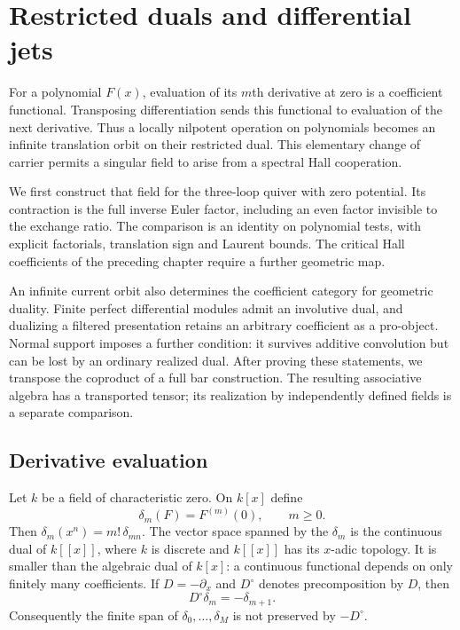 \chapter{Restricted duals and differential jets}
\label{cyjets:ch}
\begingroup
\def\eps{\epsilon}

For a polynomial $F(x)$, evaluation of its $m$th derivative at zero
is a coefficient functional. Transposing differentiation sends this
functional to evaluation of the next derivative. Thus a locally nilpotent
operation on polynomials becomes an infinite translation orbit on their
restricted dual. This elementary change of carrier permits a singular
field to arise from a spectral Hall cooperation.

We first construct that field for the three-loop quiver with zero
potential. Its contraction is the full inverse Euler factor, including
an even factor invisible to the exchange ratio. The comparison is an
identity on polynomial tests, with explicit factorials, translation sign
and Laurent bounds. The critical Hall coefficients of the preceding
chapter require a further geometric map.

An infinite current orbit also determines the coefficient category for
geometric duality. Finite perfect differential modules admit an
involutive dual, and dualizing a filtered presentation retains an arbitrary
coefficient as a pro-object. Normal support imposes a further condition:
it survives additive convolution but can be lost by an ordinary realized
dual. After proving these statements, we transpose the coproduct of a
full bar construction. The resulting associative algebra has a transported
tensor; its realization by independently defined fields is a separate
comparison.

\section{Derivative evaluation}
\label{cyjets:sec:pairing}

Let $k$ be a field of characteristic zero. On $k[x]$ define
\[
 \delta_m(F)=F^{(m)}(0),\qquad m\geq0.
\]
Then $\delta_m(x^n)=m!\,\delta_{mn}$. The vector space spanned by
the $\delta_m$ is the continuous dual of $k[[x]]$, where $k$ is
discrete and $k[[x]]$ has its $x$-adic topology. It is smaller than
the algebraic dual of $k[x]$: a continuous functional depends on
only finitely many coefficients. If $D=-\partial_x$ and $D^\circ$
denotes precomposition by $D$, then
\begin{equation}\label{cyjets:eq:rank-one-transpose}
 D^\circ\delta_m=-\delta_{m+1}.
\end{equation}
Consequently the finite span of $\delta_0,\ldots,\delta_M$ is not
preserved by $-D^\circ$.

